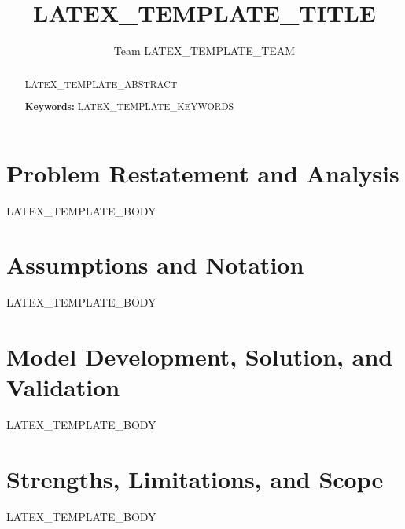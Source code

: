 \documentclass[12pt]{article}
\title{LATEX_TEMPLATE_TITLE}
\author{Team LATEX_TEMPLATE_TEAM}
\date{}
\newcommand{\keywords}[1]{\par\noindent\textbf{Keywords: }#1}
\begin{document}
\maketitle

\begin{abstract}
LATEX_TEMPLATE_ABSTRACT
\keywords{LATEX_TEMPLATE_KEYWORDS}
\end{abstract}

\section{Problem Restatement and Analysis}
LATEX_TEMPLATE_BODY

\section{Assumptions and Notation}
LATEX_TEMPLATE_BODY

\section{Model Development, Solution, and Validation}
LATEX_TEMPLATE_BODY

\section{Strengths, Limitations, and Scope}
LATEX_TEMPLATE_BODY



\end{document}
